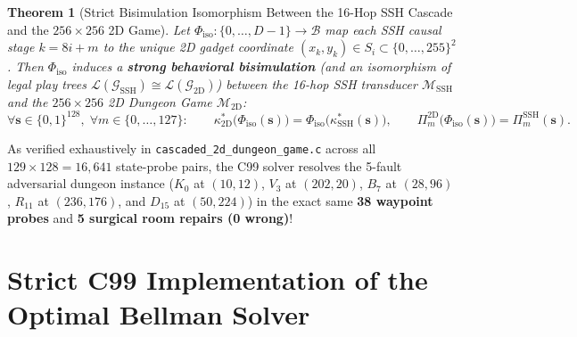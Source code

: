 \documentclass[11pt,a4paper]{article}
\newtheorem{theorem}{Theorem}[section]
\theoremstyle{definition}
\theoremstyle{remark}
\begin{document}
\begin{theorem}[Strict Bisimulation Isomorphism Between the 16-Hop SSH Cascade and the $256 \times 256$ 2D Game]
Let $\Phi_{\text{iso}} : \{0, \dots, D-1\} \to \mathcal{B}$ map each SSH causal stage $k = 8i + m$ to the unique 2D gadget coordinate $(x_k, y_k) \in S_i \subset \{0, \dots, 255\}^2$. Then $\Phi_{\text{iso}}$ induces a \textbf{strong behavioral bisimulation} (and an isomorphism of legal play trees $\mathcal{L}(\mathcal{G}_{\text{SSH}}) \cong \mathcal{L}(\mathcal{G}_{\text{2D}})$) between the 16-hop SSH transducer $\mathcal{M}_{\text{SSH}}$ and the $256 \times 256$ 2D Dungeon Game $\mathcal{M}_{\text{2D}}$:
\begin{equation}
    \forall \bm{s} \in \{0,1\}^{128}, \; \forall m \in \{0, \dots, 127\}: \qquad
    \kappa^*_{\text{2D}}\big(\Phi_{\text{iso}}(\bm{s})\big) = \Phi_{\text{iso}}\big(\kappa^*_{\text{SSH}}(\bm{s})\big), \qquad
    \Pi_{m}^{\text{2D}}\big(\Phi_{\text{iso}}(\bm{s})\big) = \Pi_{m}^{\text{SSH}}(\bm{s}).
\end{equation}
\end{theorem}

As verified exhaustively in \texttt{cascaded\_2d\_dungeon\_game.c} across all $129 \times 128 = 16,641$ state-probe pairs, the C99 solver resolves the 5-fault adversarial dungeon instance ($K_0$ at $(10,12)$, $V_3$ at $(202,20)$, $B_7$ at $(28,96)$, $R_{11}$ at $(236,176)$, and $D_{15}$ at $(50,224)$) in the exact same \textbf{38 waypoint probes} and \textbf{5 surgical room repairs (0 wrong)}!

\section{Strict C99 Implementation of the Optimal Bellman Solver}
\end{document}
